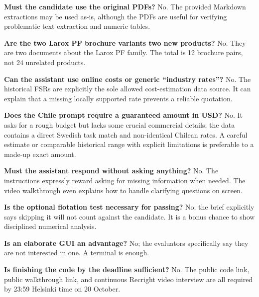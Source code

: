 \documentclass[11pt,a4paper]{article}
\begin{document}
\textbf{Must the candidate use the original PDFs?} No. The provided Markdown extractions may be used as-is, although the PDFs are useful for verifying problematic text extraction and numeric tables.

\textbf{Are the two Larox PF brochure variants two new products?} No. They are two documents about the Larox PF family. The total is 12 brochure pairs, not 24 unrelated products.

\textbf{Can the assistant use online costs or generic ``industry rates''?} No. The historical FSRs are explicitly the sole allowed cost-estimation data source. It can explain that a missing locally supported rate prevents a reliable quotation.

\textbf{Does the Chile prompt require a guaranteed amount in USD?} No. It asks for a rough budget but lacks some crucial commercial details; the data contains a direct Swedish task match and non-identical Chilean rates. A careful estimate or comparable historical range with explicit limitations is preferable to a made-up exact amount.

\textbf{Must the assistant respond without asking anything?} No. The instructions expressly reward asking for missing information when needed. The video walkthrough even explains how to handle clarifying questions on screen.

\textbf{Is the optional flotation test necessary for passing?} No; the brief explicitly says skipping it will not count against the candidate. It is a bonus chance to show disciplined numerical analysis.

\textbf{Is an elaborate GUI an advantage?} No; the evaluators specifically say they are not interested in one. A terminal is enough.

\textbf{Is finishing the code by the deadline sufficient?} No. The public code link, public walkthrough link, and continuous Recright video interview are all required by 23:59 Helsinki time on 20 October.
\end{document}
